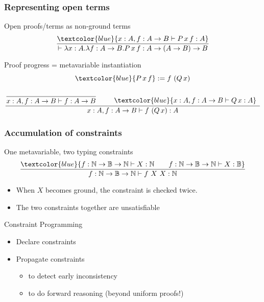 \documentclass{beamer}
\newcommand{\cblue}[1]{\textcolor{blue}{#1}}
\begin{document}
\begin{frame}[fragile]
\frametitle{Representing open terms}
 \begin{block}{Open proofs/terms as non-ground terms}
  $$\frac{\cblue{x:A, f:A \to B \vdash P\, x\, f : A}}{\vdash \lambda x:A. \lambda f:A \to B. P\, x\, f : A \to (A \to B) \to B}$$
 \end{block}

 \pause

 \begin{block}{Proof progress = metavariable instantiation}
  $$\cblue{P\, x\, f} := f~(Q\,x)$$
  $$\dfrac{
     \dfrac{}{x:A, f: A \to B \vdash f : A \to B} \quad \quad \begin{array}{c}~\\\cblue{x:A, f:A \to B \vdash Q\,x:A}\end{array}
    }
    {x:A, f:A \to B \vdash f~(Q\,x) : A}
    $$
 \end{block}
\end{frame}

\begin{frame}[fragile]
\frametitle{Accumulation of constraints}
 \begin{block}{One metavariable, two typing constraints}
 $$\frac{
   \cblue{f: \mathbb{N} \to \mathbb{B} \to \mathbb{N} \vdash X : \mathbb{N} \quad \quad f: \mathbb{N} \to \mathbb{B} \to \mathbb{N} \vdash X : \mathbb{B}}
   }{
   f: \mathbb{N} \to \mathbb{B} \to \mathbb{N} \vdash f~X~X : \mathbb{N}
   }$$

 \begin{itemize}
  \item When $X$ becomes ground, the constraint is checked \alert{twice}.
  \item The two constraints together are \alert{unsatisfiable}
 \end{itemize}
 \end{block}

 \begin{block}{Constraint Programming}
  \begin{itemize}
   \item Declare constraints
   \item Propagate constraints
    \begin{itemize}
     \item to detect early inconsistency
     \item to do \alert{forward reasoning} (beyond uniform proofs!)
    \end{itemize}
  \end{itemize}
 \end{block}
\end{frame}
\end{document}
